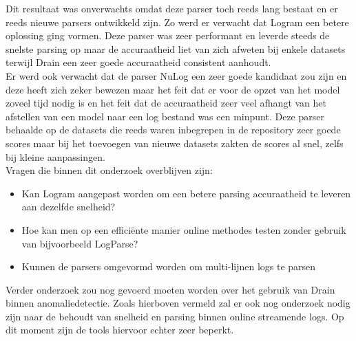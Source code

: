 Dit resultaat was onverwachts omdat deze parser toch reeds lang bestaat en er reeds nieuwe parsers ontwikkeld zijn. Zo werd er verwacht dat Logram een betere oplossing ging vormen. Deze parser was zeer performant en leverde steeds de snelste parsing op maar de accuraatheid liet van zich afweten bij enkele datasets terwijl Drain een zeer goede accuraatheid consistent aanhoudt.\\

Er werd ook verwacht dat de parser NuLog een zeer goede kandidaat zou zijn en deze heeft zich zeker bewezen maar het feit dat er voor de opzet van het model zoveel tijd nodig is en het feit dat de accuraatheid zeer veel afhangt van het afstellen van een model naar een log bestand was een minpunt. Deze parser behaalde op de datasets die reeds waren inbegrepen in de repository zeer goede scores maar bij het toevoegen van nieuwe datasets zakten de scores al snel, zelfs bij kleine aanpassingen.\\

Vragen die binnen dit onderzoek overblijven zijn:
\begin{itemize}
    \item Kan Logram aangepast worden om een betere parsing accuraatheid te leveren aan dezelfde snelheid?
    \item Hoe kan men op een efficiënte manier online methodes testen zonder gebruik van bijvoorbeeld LogParse?
    \item Kunnen de parsers omgevormd worden om multi-lijnen logs te parsen
\end{itemize} 

Verder onderzoek zou nog gevoerd moeten worden over het gebruik van Drain binnen anomaliedetectie. Zoals hierboven vermeld zal er ook nog onderzoek nodig zijn naar de behoudt van snelheid en parsing binnen online streamende logs. Op dit moment zijn de tools hiervoor echter zeer beperkt.